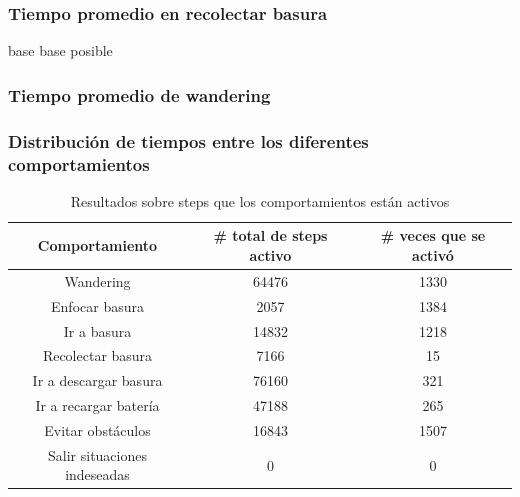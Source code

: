 \subsubsection{Tiempo promedio en recolectar basura}
base
base posible

\subsubsection{Tiempo promedio de wandering}

\subsubsection{Distribuci\'on de tiempos entre los diferentes comportamientos}

\begin{table}[ht]
	\begin{center}
		\begin{tabular}{|c|c|c|}
			\hline
			Comportamiento & \# total de steps activo & \# veces que se activ\'o \\
			\hline
			Wandering & 64476 & 1330 \\
			Enfocar basura & 2057 & 1384 \\
			Ir a basura & 14832 & 1218 \\
			Recolectar basura & 7166 & 15 \\
			Ir a descargar basura & 76160 & 321 \\
			Ir a recargar bater\'ia & 47188 & 265 \\
			Evitar obst\'aculos & 16843 & 1507 \\
			Salir situaciones indeseadas & 0 & 0 \\
			\hline
		\end{tabular}
	\end{center}
	\caption{Resultados sobre steps que los comportamientos est\'an activos }
	\label{behaviours_stats}
\end{table}

